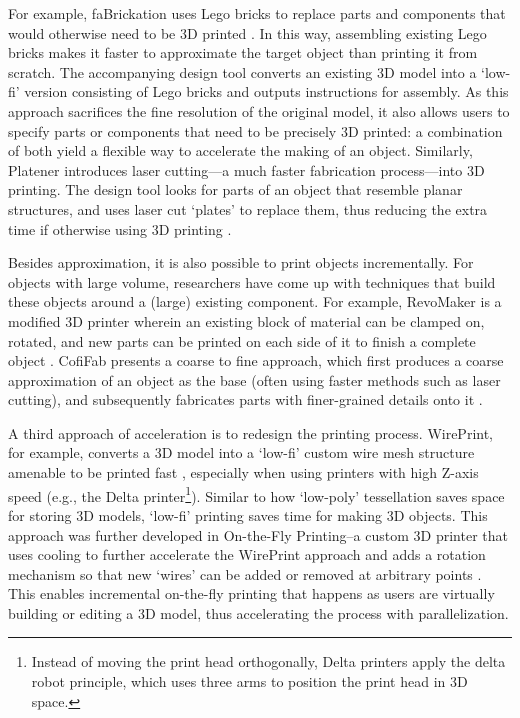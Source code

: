 For example, faBrickation uses Lego bricks to replace parts and components that would otherwise need to be 3D printed \cite{mueller2014fabrickation}. In this way, assembling existing Lego bricks makes it faster to approximate the target object than printing it from scratch. The accompanying design tool converts an existing 3D model into a `low-fi' version consisting of Lego bricks and outputs instructions for assembly. As this approach sacrifices the fine resolution of the original model, it also allows users to specify parts or components that need to be precisely 3D printed: a combination of both yield a flexible way to accelerate the making of an object. Similarly, Platener introduces laser cutting---a much faster fabrication process---into 3D printing. The design tool looks for parts of an object that resemble planar structures, and uses laser cut `plates' to replace them, thus reducing the extra time if otherwise using 3D printing \cite{beyer2015platener}.

Besides approximation, it is also possible to print objects incrementally. For objects with large volume, researchers have come up with techniques that build these objects around a (large) existing component. For example, RevoMaker is a modified 3D printer wherein an existing block of material can be clamped on, rotated, and new parts can be printed on each side of it to finish a complete object \cite{gao2015revomaker}. CofiFab presents a coarse to fine approach, which first produces a coarse approximation of an object as the base (often using faster methods such as laser cutting), and subsequently fabricates parts with finer-grained details onto it \cite{songcofifab}.

A third approach of acceleration is to redesign the printing process. WirePrint, for example, converts a 3D model into a `low-fi' custom wire mesh structure amenable to be printed fast \cite{mueller2014wireprint}, especially when using printers with high Z-axis speed (e.g., the Delta printer\footnote{Instead of moving the print head orthogonally, Delta printers apply the delta robot principle, which uses three arms to position the print head in 3D space.}). Similar to how `low-poly' tessellation saves space for storing 3D models, `low-fi' printing saves time for making 3D objects. This approach was further developed in On-the-Fly Printing--a custom 3D printer that uses cooling to further accelerate the WirePrint approach and adds a rotation mechanism so that new `wires' can be added or removed at arbitrary points \cite{peng2016fly}. This enables incremental on-the-fly printing that happens as users are virtually building or editing a 3D model, thus accelerating the process with parallelization.

